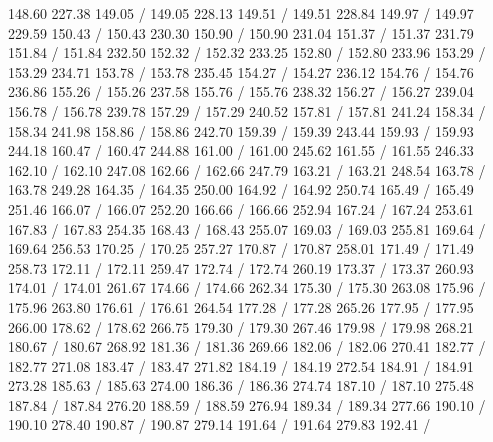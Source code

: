 { 148.60 227.38 149.05 /
 149.05 228.13 149.51 /
 149.51 228.84 149.97 /
 149.97 229.59 150.43 /
 150.43 230.30 150.90 /
 150.90 231.04 151.37 /
 151.37 231.79 151.84 /
 151.84 232.50 152.32 /
 152.32 233.25 152.80 /
 152.80 233.96 153.29 /
 153.29 234.71 153.78 /
 153.78 235.45 154.27 /
 154.27 236.12 154.76 /
 154.76 236.86 155.26 /
 155.26 237.58 155.76 /
 155.76 238.32 156.27 /
 156.27 239.04 156.78 /
 156.78 239.78 157.29 /
 157.29 240.52 157.81 /
 157.81 241.24 158.34 /
 158.34 241.98 158.86 /
 158.86 242.70 159.39 /
 159.39 243.44 159.93 /
 159.93 244.18 160.47 /
 160.47 244.88 161.00 /
 161.00 245.62 161.55 /
 161.55 246.33 162.10 /
 162.10 247.08 162.66 /
 162.66 247.79 163.21 /
 163.21 248.54 163.78 /
 163.78 249.28 164.35 /
 164.35 250.00 164.92 /
 164.92 250.74 165.49 /
 165.49 251.46 166.07 /
 166.07 252.20 166.66 /
 166.66 252.94 167.24 /
 167.24 253.61 167.83 /
 167.83 254.35 168.43 /
 168.43 255.07 169.03 /
 169.03 255.81 169.64 /
 169.64 256.53 170.25 /
 170.25 257.27 170.87 /
 170.87 258.01 171.49 /
 171.49 258.73 172.11 /
 172.11 259.47 172.74 /
 172.74 260.19 173.37 /
 173.37 260.93 174.01 /
 174.01 261.67 174.66 /
 174.66 262.34 175.30 /
 175.30 263.08 175.96 /
 175.96 263.80 176.61 /
 176.61 264.54 177.28 /
 177.28 265.26 177.95 /
 177.95 266.00 178.62 /
 178.62 266.75 179.30 /
 179.30 267.46 179.98 /
 179.98 268.21 180.67 /
 180.67 268.92 181.36 /
 181.36 269.66 182.06 /
 182.06 270.41 182.77 /
 182.77 271.08 183.47 /
 183.47 271.82 184.19 /
 184.19 272.54 184.91 /
 184.91 273.28 185.63 /
 185.63 274.00 186.36 /
 186.36 274.74 187.10 /
 187.10 275.48 187.84 /
 187.84 276.20 188.59 /
 188.59 276.94 189.34 /
 189.34 277.66 190.10 /
 190.10 278.40 190.87 /
 190.87 279.14 191.64 /
 191.64 279.83 192.41 /
}
